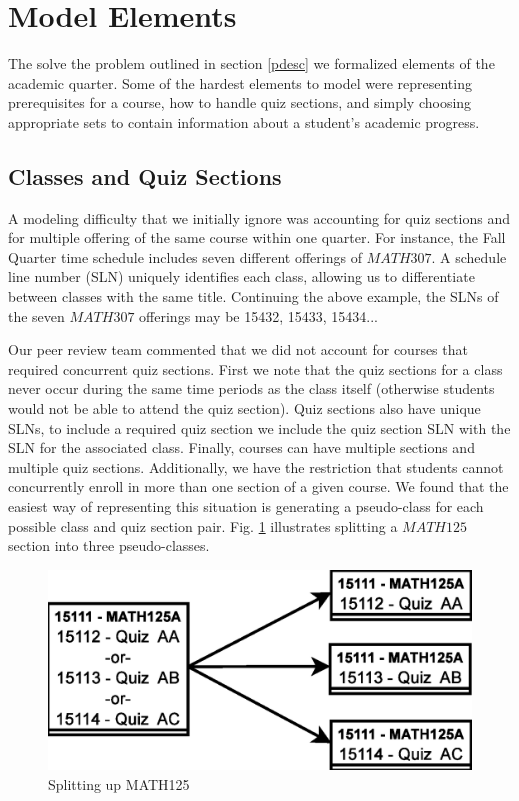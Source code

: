 \documentclass[11pt]{article} %
\begin{document}
\section{Model Elements} The solve the problem outlined in section \ref{pdesc}
we formalized elements of the academic quarter. Some of the hardest elements to
model were representing prerequisites for a course, how to handle quiz sections,
and simply choosing appropriate sets to contain information about a student's
academic progress.

\subsection{Classes and Quiz Sections} \label{classDefs} A modeling
difficulty that we initially ignore was accounting for quiz sections and
for multiple offering of the same course within one quarter.
For instance, the Fall Quarter time schedule includes seven different
offerings of $MATH307$. A schedule line number (SLN)
uniquely identifies each class, allowing us to differentiate between classes
with the same title. Continuing the above example,
the SLNs of the seven $MATH307$ offerings may be 15432, 15433, 15434...

Our peer review team commented that we did not account for courses that
required concurrent quiz sections. First we note that the quiz sections for
a class never occur during the same time periods as the class itself (otherwise
students would not be able to attend the quiz section). Quiz sections also have
unique SLNs, to include a required quiz section we include the quiz section SLN
with the SLN for the associated class. Finally, courses can have multiple sections
and multiple quiz sections. Additionally, we have the restriction that students
cannot concurrently enroll in more than one section of a given course. We found that
the easiest way of representing this situation is generating a pseudo-class for each
possible class and quiz section pair.
Fig. \ref{quizzes} illustrates splitting a $MATH125$ section into three pseudo-classes.
\begin{figure} [ht] 
    \begin{center}
        \includegraphics[scale=0.4]{quiz_sections} 
    \end{center}
    \caption{Splitting up MATH125} 
    \label{quizzes} 
\end{figure}
\end{document}
